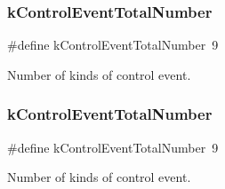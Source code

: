 \subsubsection{\texorpdfstring{k\+Control\+Event\+Total\+Number}{kControlEventTotalNumber}\hspace{0.1cm}{\footnotesize\ttfamily [1/2]}}
{\footnotesize\ttfamily \#define k\+Control\+Event\+Total\+Number~9}

Number of kinds of control event. \mbox{\label{group__control__extension_ga0943a168609cb108419ba7f34c64130e}} 
\subsubsection{\texorpdfstring{k\+Control\+Event\+Total\+Number}{kControlEventTotalNumber}\hspace{0.1cm}{\footnotesize\ttfamily [2/2]}}
{\footnotesize\ttfamily \#define k\+Control\+Event\+Total\+Number~9}

Number of kinds of control event. 